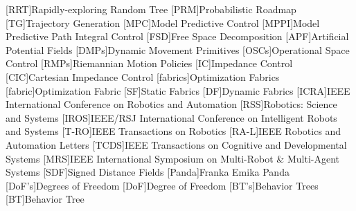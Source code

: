 [RRT]{Rapidly-exploring Random Tree}
[PRM]{Probabilistic Roadmap}
[TG]{Trajectory Generation}
[MPC]{Model Predictive Control}
[MPPI]{Model Predictive Path Integral Control}
[FSD]{Free Space Decomposition}
[APF]{Artificial Potential Fields}
[DMPs]{Dynamic Movement Primitives}
[OSCs]{Operational Space Control}
[RMPs]{Riemannian Motion Policies}
[IC]{Impedance Control}
[CIC]{Cartesian Impedance Control}
[fabrics]{Optimization Fabrics}
[fabric]{Optimization Fabric}
[SF]{Static Fabrics}
[DF]{Dynamic Fabrics}
[ICRA]{IEEE International Conference on Robotics and Automation}
[RSS]{Robotics: Science and Systems}
[IROS]{IEEE/RSJ International Conference on Intelligent Robots and Systems}
[T-RO]{IEEE Transactions on Robotics}
[RA-L]{IEEE Robotics and Automation Letters}
[TCDS]{IEEE Transactions on Cognitive and Developmental Systems}
[MRS]{IEEE International Symposium on Multi-Robot \& Multi-Agent Systems}
[SDF]{Signed Distance Fields}
[Panda]{Franka Emika Panda}
[DoF's]{Degrees of Freedom}
[DoF]{Degree of Freedom}
[BT's]{Behavior Trees}
[BT]{Behavior Tree}


\newcommand{\tn}[1]{\textnormal{#1}}
\newcommand{\tb}[1]{\textbf{#1}}
\newcommand{\ti}[1]{\textit{#1}}
\newcommand{\va}{\mathbf{a}}
\newcommand{\vb}{\mathbf{b}}
\newcommand{\vc}{\mathbf{c}}
\newcommand{\vd}{\mathbf{d}}
\newcommand{\ve}{\mathbf{e}}
\newcommand{\vf}{\mathbf{f}}
\newcommand{\vg}{\mathbf{g}}
\newcommand{\vh}{\mathbf{h}}
\newcommand{\vl}{\mathbf{l}}
\newcommand{\vm}{\mathbf{m}}
\newcommand{\vn}{\mathbf{n}}
\newcommand{\vp}{\mathbf{p}}
\newcommand{\vq}{\mathbf{q}}
\newcommand{\vr}{\mathbf{r}}
\newcommand{\vs}{\mathbf{s}}
\newcommand{\vS}{\mathbf{S}}
\newcommand{\vo}{\mathbf{o}}
\newcommand{\vt}{\mathbf{t}}
\newcommand{\vu}{\mathbf{u}}
\newcommand{\vv}{\mathbf{v}}
\newcommand{\vw}{\mathbf{w}}
\newcommand{\vx}{\mathbf{x}}
\newcommand{\vX}{\mathbf{X}}
\newcommand{\vy}{\mathbf{y}}
\newcommand{\vz}{\mathbf{z}}
\newcommand{\cA}{\mathcal{A}}
\newcommand{\cB}{\mathcal{B}}
\newcommand{\cC}{\mathcal{C}}
\newcommand{\cD}{\mathcal{D}}
\newcommand{\cE}{\mathcal{E}}
\newcommand{\cF}{\mathcal{F}}
\newcommand{\cG}{\mathcal{G}}
\newcommand{\cH}{\mathcal{H}}
\newcommand{\cI}{\mathcal{I}}
\newcommand{\cJ}{\mathcal{J}}
\newcommand{\cK}{\mathcal{K}}
\newcommand{\cL}{\mathcal{L}}
\newcommand{\cM}{\mathcal{M}}
\newcommand{\cN}{\mathcal{N}}
\newcommand{\cO}{\mathcal{O}}
\newcommand{\cP}{\mathcal{P}}
\newcommand{\cQ}{\mathcal{Q}}
\newcommand{\cR}{\mathcal{R}}
\newcommand{\cS}{\mathcal{S}}
\newcommand{\cT}{\mathcal{T}}
\newcommand{\cU}{\mathcal{U}}
\newcommand{\cV}{\mathcal{V}}
\newcommand{\cW}{\mathcal{W}}
\newcommand{\cX}{\mathcal{X}}
\newcommand{\cY}{\mathcal{Y}}
\newcommand{\cZ}{\mathcal{Z}}

